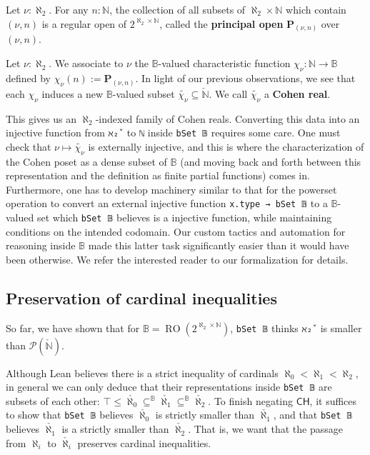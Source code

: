 \documentclass[a4paper,USenglish,cleveref, autoref]{lipics-v2019}
\newcommand{\B}{\mathbb{B}}
\newcommand{\lil}{\lstinline}
\newcommand{\N}{\mathbb{N}}
\begin{document}
\begin{definition}
  Let $\nu : \aleph_2$. For any $n : \N$, the collection of all subsets of $\aleph_2 \times \N$ which contain $(\nu, n)$ is a regular open of $2^{\aleph_2 \times \N}$, called the \textbf{principal open} $\mathbf{P}_{(\nu, n)}$ over $(\nu, n)$.
\end{definition}

\begin{definition}
  Let $\nu : \aleph_2$. We associate to $\nu$ the $\B$-valued characteristic function $\chi_{\nu} : \N \to \B$ defined by $\chi_{\nu}(n) := \mathbf{P}_{(\nu, n)}$. In light of our previous observations, we see that each $\chi_{\nu}$ induces a new $\B$-valued subset $\widetilde{\chi_{\nu}} \subseteq \check{\N}$. We call $\widetilde{\chi_{\nu}}$ a \textbf{Cohen real}.
\end{definition}
This gives us an $\aleph_2$-indexed family of Cohen reals. Converting this data into an injective function from \lil{ℵ₂̌ } to \lil{ℕ} inside \lil{bSet 𝔹} requires some care. One must check that $\nu \mapsto \widetilde{\chi_{\nu}}$ is externally injective, and this is where the characterization of the Cohen poset as a dense subset of $\B$ (and moving back and forth between this representation and the definition as finite partial functions) comes in. Furthermore, one has to develop machinery similar to that for the powerset operation to convert an external injective function \lstinline{x.type → bSet 𝔹} to a $\B$-valued set which \lstinline{bSet 𝔹} believes is a injective function, while maintaining conditions on the intended codomain. Our custom tactics and automation for reasoning inside $\B$ made this latter task significantly easier than it would have been otherwise. We refer the interested reader to our formalization for details.

\subsection{Preservation of cardinal inequalities} \label{subsect:cardinal-inequalities}
So far, we have shown that for $\B = \operatorname{RO}(2^{\aleph_2 \times \mathbb{N}})$, \lil{bSet 𝔹} thinks \lstinline{ℵ₂̌ } is smaller than $\mathcal{P}(\check{\mathbb{N}})$.

Although Lean believes there is a strict inequality of cardinals $\aleph_0 < \aleph_1 < \aleph_2$, in general we can only deduce that their representations inside \lil{bSet 𝔹} are subsets of each other: $\top \leq \check{\aleph_0} \subseteq^\B \check{\aleph_1} \subseteq^\B \check{\aleph_2}$. To finish negating $\mathsf{CH}$, it suffices to show that \lstinline{bSet 𝔹} believes $\check{\aleph_0}$ is strictly smaller than $\check{\aleph_1}$, and that \lstinline{bSet 𝔹} believes $\check{\aleph_1}$ is a strictly smaller than $\check{\aleph_2}$. That is, we want that the passage from $\aleph_i$ to $\check{\aleph_i}$ preserves cardinal inequalities.
\end{document}
